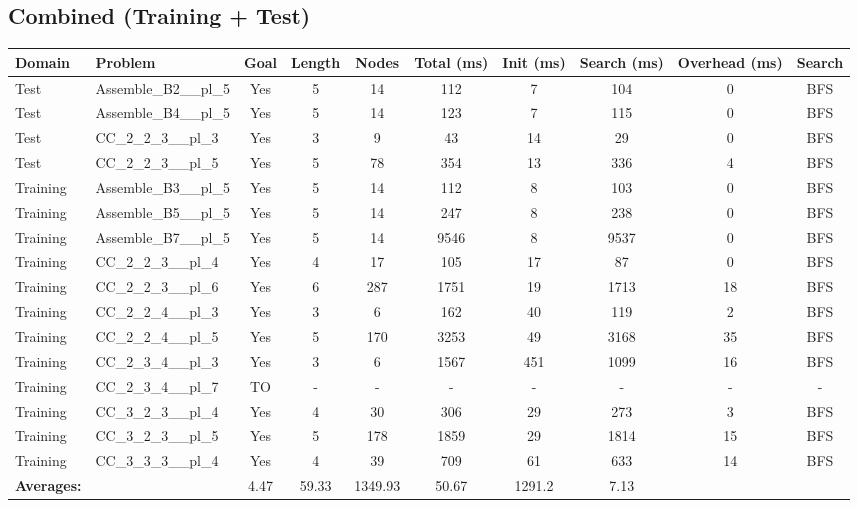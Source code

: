 \documentclass{article}
\begin{document}
\subsection*{Combined (Training + Test)}
\begin{tabular}{llcccccccc}
\toprule
Domain & Problem & Goal & Length & Nodes & Total (ms) & Init (ms) & Search (ms) & Overhead (ms) & Search \\
\midrule
Test & Assemble\_B2\_\_pl\_5 & Yes & 5 & 14 & 112 & 7 & 104 & 0 & BFS \\
Test & Assemble\_B4\_\_pl\_5 & Yes & 5 & 14 & 123 & 7 & 115 & 0 & BFS \\
Test & CC\_2\_2\_3\_\_pl\_3 & Yes & 3 & 9 & 43 & 14 & 29 & 0 & BFS \\
Test & CC\_2\_2\_3\_\_pl\_5 & Yes & 5 & 78 & 354 & 13 & 336 & 4 & BFS \\
Training & Assemble\_B3\_\_pl\_5 & Yes & 5 & 14 & 112 & 8 & 103 & 0 & BFS \\
Training & Assemble\_B5\_\_pl\_5 & Yes & 5 & 14 & 247 & 8 & 238 & 0 & BFS \\
Training & Assemble\_B7\_\_pl\_5 & Yes & 5 & 14 & 9546 & 8 & 9537 & 0 & BFS \\
Training & CC\_2\_2\_3\_\_pl\_4 & Yes & 4 & 17 & 105 & 17 & 87 & 0 & BFS \\
Training & CC\_2\_2\_3\_\_pl\_6 & Yes & 6 & 287 & 1751 & 19 & 1713 & 18 & BFS \\
Training & CC\_2\_2\_4\_\_pl\_3 & Yes & 3 & 6 & 162 & 40 & 119 & 2 & BFS \\
Training & CC\_2\_2\_4\_\_pl\_5 & Yes & 5 & 170 & 3253 & 49 & 3168 & 35 & BFS \\
Training & CC\_2\_3\_4\_\_pl\_3 & Yes & 3 & 6 & 1567 & 451 & 1099 & 16 & BFS \\
Training & CC\_2\_3\_4\_\_pl\_7 & TO & - & - & - & - & - & - & - \\
Training & CC\_3\_2\_3\_\_pl\_4 & Yes & 4 & 30 & 306 & 29 & 273 & 3 & BFS \\
Training & CC\_3\_2\_3\_\_pl\_5 & Yes & 5 & 178 & 1859 & 29 & 1814 & 15 & BFS \\
Training & CC\_3\_3\_3\_\_pl\_4 & Yes & 4 & 39 & 709 & 61 & 633 & 14 & BFS \\
\textbf{Averages:} & & 4.47 & 59.33 & 1349.93 & 50.67 & 1291.2 & 7.13 & \\
\bottomrule
\end{tabular}
\\[0.7cm]
\end{document}
